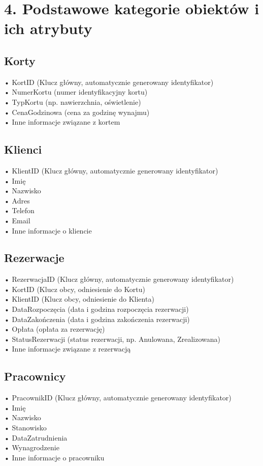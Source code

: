 \documentclass{article}
\begin{document}
\section*{4. Podstawowe kategorie obiektów i ich atrybuty}

\subsection*{Korty}
•	KortID (Klucz główny, automatycznie generowany identyfikator)\\
•	NumerKortu (numer identyfikacyjny kortu)\\
•	TypKortu (np. nawierzchnia, oświetlenie)\\
•	CenaGodzinowa (cena za godzinę wynajmu)\\
•	Inne informacje związane z kortem\\

\subsection*{Klienci}
•	KlientID (Klucz główny, automatycznie generowany identyfikator)\\
•	Imię\\
•	Nazwisko\\
•	Adres\\
•	Telefon\\
•	Email\\
•	Inne informacje o kliencie

\subsection*{Rezerwacje}
•	RezerwacjaID (Klucz główny, automatycznie generowany identyfikator)\\
•	KortID (Klucz obcy, odniesienie do Kortu)\\
•	KlientID (Klucz obcy, odniesienie do Klienta)\\
•	DataRozpoczęcia (data i godzina rozpoczęcia rezerwacji)\\
•	DataZakończenia (data i godzina zakończenia rezerwacji)\\
•	Opłata (opłata za rezerwację)\\
•	StatusRezerwacji (status rezerwacji, np. Anulowana, Zrealizowana)\\
•	Inne informacje związane z rezerwacją\\

\subsection*{Pracownicy}
•	PracownikID (Klucz główny, automatycznie generowany identyfikator)\\
•	Imię\\
•	Nazwisko\\
•	Stanowisko\\
•	DataZatrudnienia\\
•	Wynagrodzenie\\
•	Inne informacje o pracowniku
\end{document}
